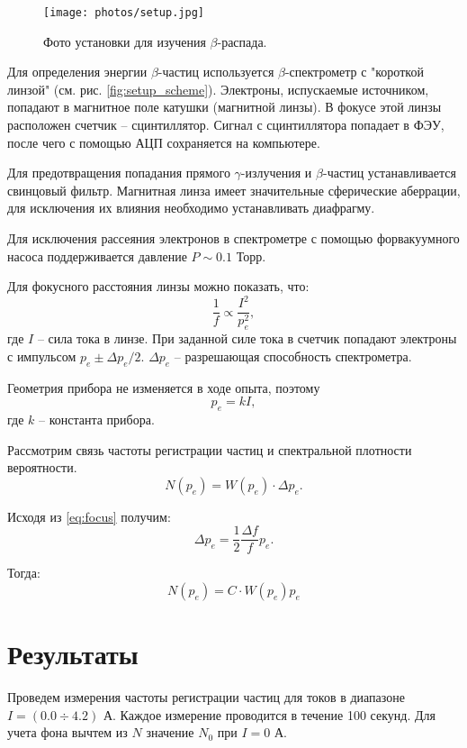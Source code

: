 \documentclass[12pt,a4paper]{article}
\newcommand{\figref}[1]{(см. рис. \ref{#1})}
\begin{document}
	\begin{figure}[H]
		\centering
		\texttt{[image: photos/setup.jpg]}
		\caption{Фото установки для изучения $\beta$-распада.}
		\label{fig:setup_photo}
	\end{figure}
	
	Для определения энергии $\beta$-частиц используется $\beta$-спектрометр с "короткой линзой" \; \figref{fig:setup_scheme}. Электроны, испускаемые источником, попадают в магнитное поле катушки (магнитной линзы). В фокусе этой линзы расположен счетчик -- сцинтиллятор. Сигнал с сцинтиллятора попадает в ФЭУ, после чего с помощью АЦП сохраняется на компьютере.
	
	Для предотвращения попадания прямого $\gamma$-излучения и $\beta$-частиц устанавливается свинцовый фильтр. Магнитная линза имеет значительные сферические аберрации, для исключения их влияния необходимо устанавливать диафрагму.
	
	Для исключения рассеяния электронов в спектрометре с помощью форвакуумного насоса поддерживается давление $P \sim 0.1$ Торр.
	
	Для фокусного расстояния линзы можно показать, что:
	\begin{equation}
		\frac{1}{f} \propto \frac{I^2}{p_e^2},
		\label{eq:focus}
	\end{equation}
	где $I$ -- сила тока в линзе. При заданной силе тока в счетчик попадают электроны с импульсом $p_e \pm \Delta p_e / 2$. $\Delta p_e$ -- разрешающая способность спектрометра.
	
	Геометрия прибора не изменяется в ходе опыта, поэтому
	\begin{equation}
		p_e = kI,
	\end{equation}
	где $k$ -- константа прибора.
	
	Рассмотрим связь частоты регистрации частиц и спектральной плотности вероятности.
	$$N(p_e) = W(p_e) \cdot \Delta p_e.$$
	
	Исходя из \eqref{eq:focus} получим:
	$$ \Delta p_e = \frac{1}{2} \frac{\Delta f}{f} 	p_e.$$
	
	Тогда:
	\begin{equation}
		N(p_e) = C \cdot W(p_e) p_e
		\label{eq:fermi}
	\end{equation}
	
	\section*{Результаты}
	
	Проведем измерения частоты регистрации частиц для токов в диапазоне $I = (0.0 \div 4.2)$ А. Каждое измерение проводится в течение 100 секунд. Для учета фона вычтем из $N$ значение $N_0$ при $I = 0$ А.
	
\end{document}

